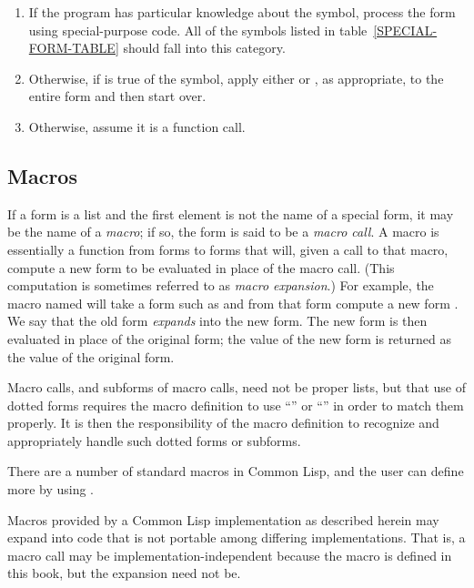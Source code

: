 \begin{enumerate}
\item
If the program has particular knowledge about the symbol,
process the form using special-purpose code.
All of the symbols listed in table~\ref{SPECIAL-FORM-TABLE}
should fall into this category. 

\item
Otherwise, if  is true of the symbol, apply either
 or , as appropriate,
to the entire form and then start over.

\item
Otherwise, assume it is a function call.
\end{enumerate}

\subsection{Macros}

If a form is a list and the first element is not the name of a special
form, it may be the name of a \emph{macro}; if so, the form is said
to be a \emph{macro call}.  A macro is essentially a function from
forms to forms that will, given a call to that macro, compute
a new form to be evaluated in place of the macro call.
(This computation is sometimes referred to as \emph{macro expansion}.)
For example, the macro named  will take a form such as
 and from that form compute a new form
.  We say that the old
form \emph{expands} into the new form.  The new form is then evaluated in
place of the original form; the value of the new form is returned as the
value of the original form.

Macro calls, and subforms
of macro calls, need not be proper lists, but that use of dotted forms
requires the macro definition to use ``'' or
``'' in order to match them properly.
It is then the responsibility of the macro definition to recognize
and appropriately handle such dotted forms or subforms.

There are a number of standard macros in Common Lisp, and the user can define more
by using .

Macros provided by a Common Lisp implementation as described herein may expand
into code that is not portable among differing implementations.
That is, a macro call may be implementation-independent because
the macro is defined in this book, but the expansion need not be.

